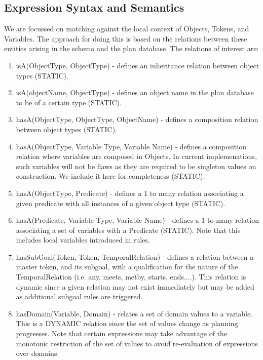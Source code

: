 \documentclass[10pt, letterpaper, twoside]{article}
\begin{document}
\subsection{Expression Syntax and Semantics}
We are focussed on matching against the local context of Objects, Tokens, and Variables. The approach for doing this is based on the relations between these entities arising in the schema and the plan database. The relations of interest are:
\begin{enumerate}
\item isA(ObjectType, ObjectType) - defines an inheritance relation between object types (STATIC).
\item isA(objectName, ObjectType) - defines an object name in the plan database to be of a certain type (STATIC).
\item hasA(ObjectType, ObjectType, ObjectName) - defines a composition relation between object types (STATIC).
\item hasA(ObjectType, Variable Type, Variable Name) - defines a composition relation where variables are composed in Objects. In current implemenations, such variables will not be flaws as they are required to be singleton values on construction. We include it here for completeness (STATIC). 
\item hasA(ObjectType, Predicate) - defines a 1 to many relation associating a given predicate with all instances of a given object type (STATIC).
\item hasA(Predicate, Variable Type, Variable Name) - defines a 1 to many relation associating a set of variables with a Predicate (STATIC). Note that this includes local variables introduced in rules.
\item hasSubGoal(Token, Token, TemporalRelation) - defines a relation between a master token, and its subgoal, with a qualification for the nature of the TemporalRelation (i.e. any, meets, metby, starts, ends....). This relation is dynamic since a given relation may not exist immediately but may be added as additional subgoal rules are triggered.
\item hasDomain(Variable, Domain) - relates a set of domain values to a variable. This is a DYNAMIC relation since the set of values change as planning progresses. Note that certain expressions may take advantage of the monotonic restriction of the set of values to avoid re-evaluation of expressions over domains.
\end{enumerate}
\end{document}
